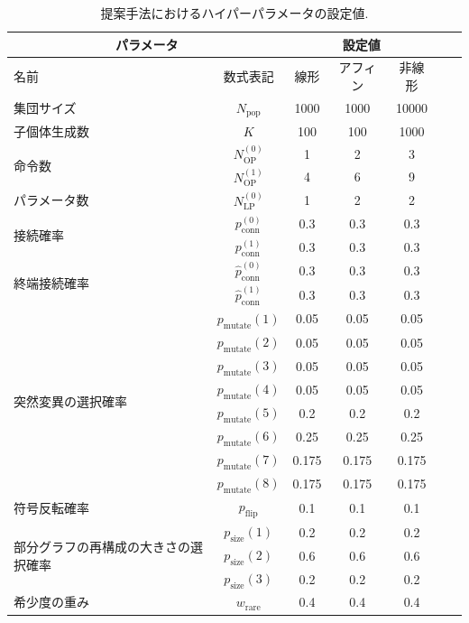\documentclass[11pt,oneside,openany,report]{jsbook}
\begin{document}
\begin{table}[tbp]
  \caption{提案手法におけるハイパーパラメータの設定値.}
  \label{table:exp:setting:proposed}
  \centering
  \begin{tabular}{|l|c|c|c|c|c|c|}
    \hline
    \multicolumn{2}{|c|}{パラメータ} & \multicolumn{3}{c|}{設定値} \\
    \hline
    名前 & 数式表記 & 線形 & アフィン & 非線形 \\
    \hline
    \hline
    集団サイズ    & $N_\mathrm{pop}$ & 1000 & 1000 & 10000 \\
    \hline
    子個体生成数  & $K$ & 100 & 100 & 1000 \\
    \hline
    \multirow{2}{*}{命令数}
    & $N_\mathrm{OP}^{(0)}$ & 1 & 2 & 3 \\
    & $N_\mathrm{OP}^{(1)}$ & 4 & 6 & 9 \\
    \hline
    パラメータ数 & $N_\mathrm{LP}^{(0)}$ & 1 & 2 & 2 \\
    \hline
    \multirow{2}{*}{接続確率}
    & $p^{(0)}_\mathrm{conn}$ & 0.3 & 0.3 & 0.3 \\
    & $p^{(1)}_\mathrm{conn}$ & 0.3 & 0.3 & 0.3 \\
    \hline
    \multirow{2}{*}{終端接続確率}
    & $\hat{p}^{(0)}_\mathrm{conn}$ & 0.3 & 0.3 & 0.3 \\
    & $\hat{p}^{(1)}_\mathrm{conn}$ & 0.3 & 0.3 & 0.3 \\
    \hline
    \multirow{8}{*}{突然変異の選択確率}
    & $p_\mathrm{mutate}(1)$ & 0.05 & 0.05 & 0.05 \\
    & $p_\mathrm{mutate}(2)$ & 0.05 & 0.05 & 0.05 \\
    & $p_\mathrm{mutate}(3)$ & 0.05 & 0.05 & 0.05 \\
    & $p_\mathrm{mutate}(4)$ & 0.05 & 0.05 & 0.05 \\
    & $p_\mathrm{mutate}(5)$ & 0.2 & 0.2 & 0.2 \\
    & $p_\mathrm{mutate}(6)$ & 0.25 & 0.25 & 0.25 \\
    & $p_\mathrm{mutate}(7)$ & 0.175 & 0.175 & 0.175 \\
    & $p_\mathrm{mutate}(8)$ & 0.175 & 0.175 & 0.175 \\
    \hline
    符号反転確率 & $p_\mathrm{flip}$ & 0.1 & 0.1 & 0.1 \\
    \hline
    \multirow{3}{*}{部分グラフの再構成の大きさの選択確率}
    & $p_\mathrm{size}(1)$ & 0.2 & 0.2 & 0.2 \\
    & $p_\mathrm{size}(2)$ & 0.6 & 0.6 & 0.6 \\
    & $p_\mathrm{size}(3)$ & 0.2 & 0.2 & 0.2 \\
    \hline
    希少度の重み & $w_\mathrm{rare}$ & 0.4 & 0.4 & 0.4 \\
    \hline
  \end{tabular}
\end{table}
\end{document}
